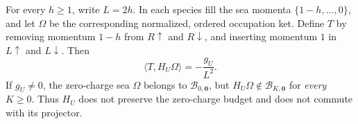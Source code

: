 \begin{theorem}
\label{thm:ch21-u-zero-box-witness}
For every \(h\ge1\), write \(L=2h\).  In each species fill the sea
momenta \(\{1-h,\ldots,0\}\), and let \(\Omega\) be the corresponding
normalized, ordered occupation ket.  Define \(T\) by removing
momentum \(1-h\) from \(R\uparrow\) and \(R\downarrow\), and
inserting momentum \(1\) in \(L\uparrow\) and \(L\downarrow\).
Then
\begin{equation}
 \langle T,H_U\Omega\rangle=-\frac{g_U}{L^2}.
 \label{eq:ch21-u-witness-coefficient}
\end{equation}
If \(g_U\ne0\), the zero-charge sea \(\Omega\) belongs to
\(\mathcal B_{0,\mathbf0}\), but
\(H_U\Omega\notin\mathcal B_{K,\mathbf0}\) for \emph{every}
\(K\ge0\).  Thus \(H_U\) does not preserve the zero-charge budget
and does not commute with its projector.
\end{theorem}
